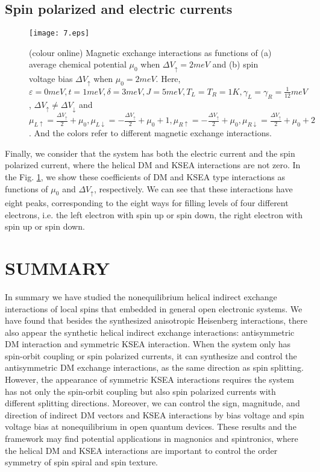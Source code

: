 \documentclass[aps,prb,twocolumn,showpacs,amssymb]{revtex4-1}
\begin{document}
\subsection{Spin polarized and electric currents}
\begin{figure}[!htp]
\centering
\texttt{[image: 7.eps]}
\vspace{-1.2cm}
\caption{(colour online)  Magnetic exchange interactions as functions of (a) average chemical potential $\mu_0$ when $\Delta{V}_\uparrow=2meV$ and (b) spin voltage bias ${\Delta}V_\uparrow$ when $\mu_0=2meV$. Here, $\varepsilon=0meV,t=1meV,\delta=3meV,J=5meV,T_L=T_R=1K, \gamma_L=\gamma_R=\frac{1}{12}meV$, $\Delta{V}_\uparrow{\neq}\Delta{V}_\downarrow$ and $\mu_{L\uparrow}=\frac{\Delta{V}_\uparrow}{2}+\mu_0,
\mu_{L\downarrow}=-\frac{\Delta{V}_\uparrow}{2}+\mu_0+1, \mu_{R\uparrow}=-\frac{\Delta{V}_\uparrow}{2}+\mu_0, \mu_{R\downarrow}=\frac{\Delta{V}_\uparrow}{2}+\mu_0+2$. And the colors refer to different magnetic exchange interactions.}\label{fig:7}
\end{figure}
Finally, we consider that the system has both the electric current and the spin polarized current, where the helical DM and KSEA interactions are not zero. In the Fig. \ref{fig:7}, we show these coefficients of DM and KSEA type interactions as functions of $\mu_0$ and $\Delta V_{\uparrow}$, respectively. We can see that these interactions have eight peaks, corresponding to the eight ways for filling levels of four different electrons, i.e. the left electron with spin up or spin down, the right electron with spin up or spin down.

\section{SUMMARY}\label{sec:summary}
In summary we have studied the nonequilibrium helical indirect exchange interactions of local spins that embedded in general open electronic systems.
We have found that besides the synthesized anisotropic Heisenberg interactions, there also appear the synthetic helical indirect exchange interactions: antisymmetric DM interaction and symmetric KSEA interaction.
When the system only has spin-orbit coupling or spin polarized currents, it can synthesize and control the antisymmetric DM exchange interactions, as the same direction as spin splitting.
However, the appearance of symmetric KSEA interactions requires the system has not only the spin-orbit coupling but also spin polarized currents with different splitting directions.
Moreover, we can control the sign, magnitude, and direction of indirect DM vectors and KSEA interactions by bias voltage and spin voltage bias at nonequilibrium in open quantum devices. These results and the framework may find potential applications in  magnonics and spintronics, where the helical DM and KSEA interactions are important to control the order symmetry of spin spiral and spin texture.
\end{document}
